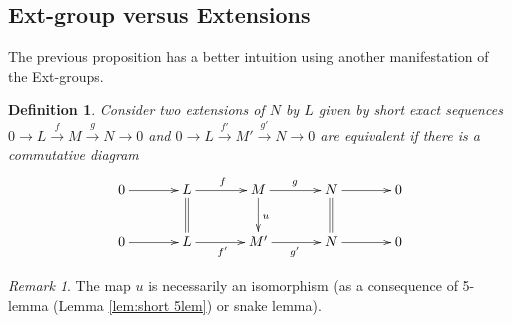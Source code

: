 \documentclass[11pt,a4paper]{article}
\numberwithin{equation}{section}
\theoremstyle{all}
\newtheorem{definition}[theorem]{Definition}
\theoremstyle{remark}
\newtheorem{remark}[theorem]{Remark}
\newcommand{\Ext}{\operatorname{Ext}\nolimits}
\newcommand{\defn}[1]{\textsl{\color{darkblue} #1}}
\begin{document}
\subsection{Ext-group versus Extensions}

The previous proposition has a better intuition using another manifestation of the Ext-groups.

\begin{definition}
Consider two extensions of $N$ by $L$ given by short exact sequences $0\to L\xrightarrow{f} M\xrightarrow{g} N\to 0$ and $0\to L\xrightarrow{f'} M'\xrightarrow{g'} N\to 0$ are \defn{equivalent} if there is a commutative diagram
\[
\xymatrix@C=35pt{
0\ar[r] & L \ar[r]^{f}\ar@{=}[d] & M\ar[r]^{g}\ar[d]^{u}& N\ar[r]\ar@{=}[d]&0 \\
0\ar[r] & L \ar[r]_{f'} &M'\ar[r]_{g'}& N\ar[r]&0 
}
\]
\end{definition}
\begin{remark}
The map $u$ is necessarily an isomorphism (as a consequence of 5-lemma (Lemma \ref{lem:short 5lem}) or snake lemma).
\end{remark}

\end{document}
